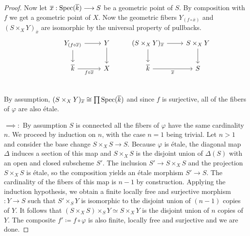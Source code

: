 \begin{proof}
	Now let $\overline{x} : \operatorname{Spec}(\overline{k}) \longrightarrow S$ be a geometric point of $S$. By composition with $f$ we get a geometric point of $X$. Now the geometric fibers $Y_{(f \circ \overline{x})}$ and $(S \times_X Y)_{\overline{x}}$  are isomorphic by the universal property of pullbacks.
	\[
		\begin{tikzcd}
			& {Y_{(f \circ \overline{x})}} & Y & {(S \times_X Y)_{\overline{x}}} & {S \times_X Y} \\
			& {\overline{k}} & X & {\overline{k}} & S \\
			{}
			\arrow[from=1-3, to=2-3]
			\arrow[from=1-2, to=1-3]
			\arrow["{f \circ \overline{x}}"', from=2-2, to=2-3]
			\arrow[from=1-2, to=2-2]
			\arrow[from=1-4, to=2-4]
			\arrow[from=1-4, to=1-5]
			\arrow[from=1-5, to=2-5]
			\arrow["{\overline{x}}"', from=2-4, to=2-5]
		\end{tikzcd}
	\]
	By assumption, $(S\times_X Y)_{\overline{x}} \cong \prod \operatorname{Spec}(\overline{k})$ and since $f$ is surjective, all of the fibers of $\varphi$ are also \'etale.
	\par $\implies:$ By assumption $S$ is connected all the fibers of $\varphi$ have the same cardinality $n$. We proceed by induction on $n$, with the case $n = 1$ being trivial. Let $n > 1$ and consider the base change $S \times_X S \to S$. Because $\varphi$ is \'etale, the diagonal map $\Delta$ induces a section of this map and $S \times_X S$ is the disjoint union of $\Delta(S)$ with an open and closed subscheme $S'$. The inclusion $S' \to S \times_X S$ and the projection $S \times_X S$ is \'etale, so the composition yields an \'etale morphism $S' \to S$. The cardinality of the fibers of this map is $n-1$ by construction. Applying the induction hypothesis, we obtain a finite locally free and surjective morphism $: Y \to S$ such that $S' \times_S Y$ is isomorphic to the disjoint union of $(n-1)$ copies  of $Y$. It follows that $(S \times_X S) \times_S Y \simeq S \times_X Y$ is the disjoint union of $n$ copies of $Y$. The composite $f' \coloneqq f \circ \varphi$ is also finite, locally free and surjective and we are done.
\end{proof}

